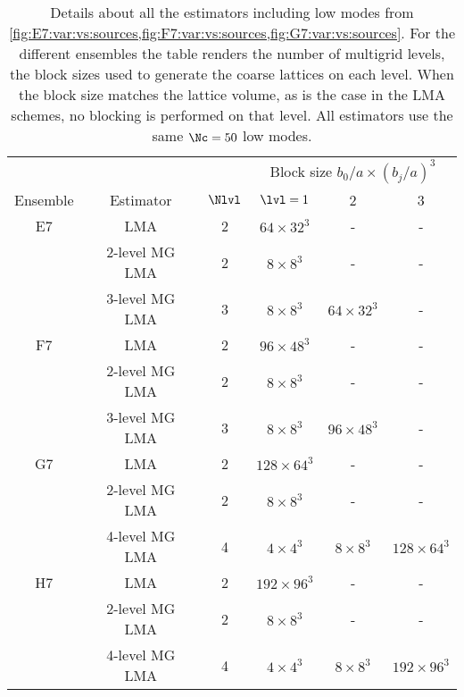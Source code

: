 \begin{table}
\centering
\begin{tabular}{cccccc}
\toprule
         &  &       & \multicolumn{3}{c}{Block size $b_0/a\times(b_j/a)^3$} \\
\cmidrule(lr){4-6}
Ensemble &  Estimator & $\Nlvl$ & $\lvl=1$      & 2 & 3 \\
\midrule
E7 & LMA            & 2 & $64\times32^3$  & -              & -               \\
   & 2-level MG LMA & 2 & $8\times8^3$    & -              & -               \\
   & 3-level MG LMA & 3 & $8\times8^3$    & $64\times32^3$ & -               \\
\midrule
F7 & LMA            & 2 & $96\times48^3$  & -              & -               \\
   & 2-level MG LMA & 2 & $8\times8^3$    & -              & -               \\
   & 3-level MG LMA & 3 & $8\times8^3$    & $96\times48^3$ & -               \\
\midrule
G7 & LMA            & 2 & $128\times64^3$ & -              & -               \\
   & 2-level MG LMA & 2 & $8\times8^3$    & -              & -               \\
   & 4-level MG LMA & 4 & $4\times4^3$    & $8\times8^3$   & $128\times64^3$ \\
\midrule
H7 & LMA            & 2 & $192\times96^3$ & -              & -               \\
   & 2-level MG LMA & 2 & $8\times8^3$    & -              & -               \\
   & 4-level MG LMA & 4 & $4\times4^3$    & $8\times8^3$   & $192\times96^3$ \\
\bottomrule
\end{tabular}
\caption{
Details about all the estimators including low modes from \cref{fig:E7:var:vs:sources,fig:F7:var:vs:sources,fig:G7:var:vs:sources}.
For the different ensembles the table renders the number of multigrid levels, the block sizes used to generate the coarse lattices on each level.
When the block size matches the lattice volume, as is the case in the LMA schemes, no blocking is performed on that level.
All estimators use the same $\Nc=50$ low modes.
}
\label{tab:lma:estimators}
\end{table}

